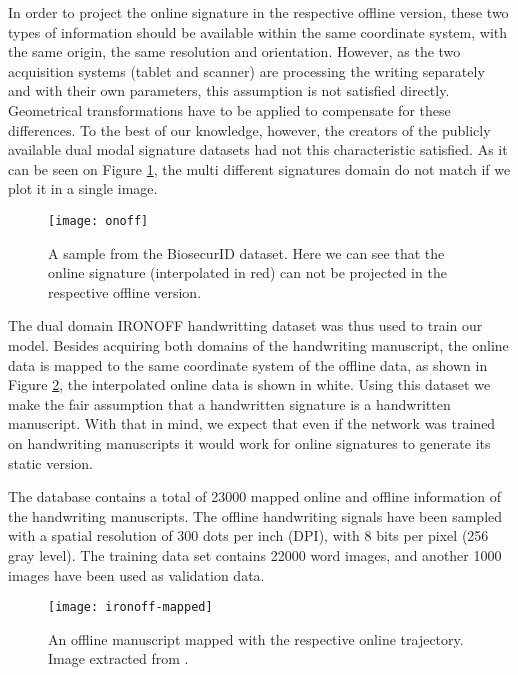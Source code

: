In order to project the online signature in the respective offline version, these two types of information should be available within the same coordinate system, with the same origin, the same resolution and orientation. However, as the two acquisition systems (tablet and scanner) are processing the writing separately and with their own parameters, this assumption is not satisfied directly. Geometrical transformations have to be applied to compensate for these differences. To the best of our knowledge, however, the creators of the publicly available dual modal signature datasets \cite{biosecurid, biomet, myidea, sigcomp2009, sigma, sigwicomp2013, sigwicomp2015} had not this characteristic satisfied. As it can be seen on Figure \ref{fig:onoff}, the multi different signatures domain do not match if we plot it in a single image.

\begin{figure}[!htb]
\centering
\texttt{[image: onoff]}
\caption{A sample from the BiosecurID dataset. Here we can see that the online signature (interpolated in red) can not be projected in the respective offline version.}
\label{fig:onoff}
\end{figure}

The dual domain IRONOFF handwritting dataset was thus used to train our model. Besides acquiring both domains of the handwriting manuscript, the online data is mapped to the same coordinate system of the offline data, as shown in Figure \ref{fig:ironoff-mapped}, the interpolated online data is shown in white. Using this dataset we make the fair assumption that a handwritten signature is a handwritten manuscript. With that in mind, we expect that even if the network was trained on handwriting manuscripts it would work for online signatures to generate its static version.

The database contains a total of 23000 mapped online and offline information of the handwriting manuscripts. The offline handwriting signals have been sampled with a spatial resolution of 300 dots per inch (DPI), with 8 bits per pixel (256 gray level). The training data set contains 22000 word images, and another 1000 images have been used as validation data.

\begin{figure}[!htb]
\centering
\texttt{[image: ironoff-mapped]}
\caption{An offline manuscript mapped with the respective online trajectory. Image extracted from \cite{viard1999ireste}.}
\label{fig:ironoff-mapped}
\end{figure}


